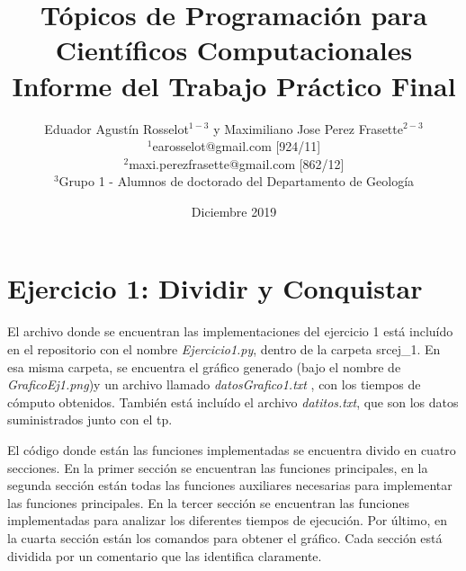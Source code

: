 \documentclass[12pt,a4paper]{article}
\begin{document}
\title{%
	Tópicos de Programación para Científicos Computacionales\\
	\large Informe del Trabajo Práctico Final}
	
\author {Eduador Agustín Rosselot$^{1-3}$ y Maximiliano Jose Perez Frasette$^{2-3}$\\ 
	\small{$^{1}$earosselot@gmail.com [924/11]}\\
	\small{$^{2}$maxi.perezfrasette@gmail.com [862/12]}\\
	\small{$^{3}$Grupo 1 - Alumnos de doctorado del Departamento de Geología}\\
	}
\date{Diciembre 2019}

\maketitle


\section{Ejercicio 1: Dividir y Conquistar}

El archivo donde se encuentran las implementaciones del ejercicio 1 está incluído en el repositorio con el nombre \textit{Ejercicio1.py}, dentro de la carpeta srcej\_1. En esa misma carpeta, se encuentra el gráfico generado (bajo el nombre de \textit{GraficoEj1.png})y un archivo llamado \textit{datosGrafico1.txt} , con los tiempos de cómputo obtenidos. También está incluído el archivo \textit{datitos.txt}, que son los datos suministrados junto con el tp.\par

El código donde están las funciones implementadas se encuentra divido en cuatro secciones. En la primer sección se encuentran las funciones principales, en la segunda sección están todas las funciones auxiliares necesarias para implementar las funciones principales. En la tercer sección se encuentran las funciones implementadas para analizar los diferentes tiempos de ejecución. Por último, en la cuarta sección están los comandos para obtener el gráfico. Cada sección está dividida por un comentario que las identifica claramente. \par
\end{document}
